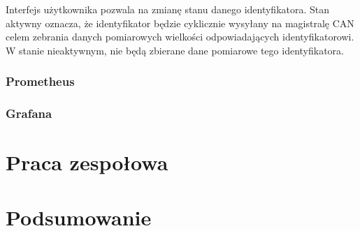 \documentclass[10pt,a4paper]{article}
\begin{document}
		Interfejs użytkownika pozwala na zmianę stanu danego identyfikatora. Stan aktywny oznacza, że identyfikator będzie cyklicznie wysyłany na magistralę CAN celem zebrania danych pomiarowych wielkości odpowiadających identyfikatorowi. W stanie nieaktywnym, nie będą zbierane dane pomiarowe tego identyfikatora.
		
		
		\subsubsection{Prometheus}
		\subsubsection{Grafana}
	\section{Praca zespołowa}
	\section{Podsumowanie}
\end{document}
